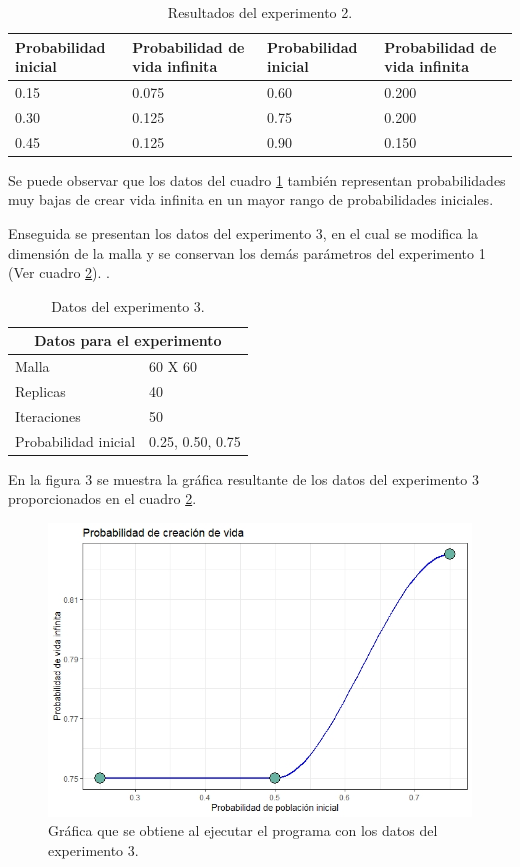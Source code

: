 \documentclass{article}
\begin{document}
\begin{table}[ht]
\centering
\begin{tabular}{ |p{3cm}|p{4.5cm}||p{3cm}|p{4.5cm}|}
 \hline
 Probabilidad inicial & Probabilidad de vida infinita & Probabilidad inicial & Probabilidad de vida infinita\\
 \hline
 0.15 & 0.075 & 0.60 & 0.200 \\
 \hline
 0.30 & 0.125 & 0.75 & 0.200 \\
 \hline
 0.45 & 0.125 & 0.90 & 0.150 \\
 \hline
\end{tabular}
\caption{Resultados del experimento 2.}
\label{Cuadro 4}
\end{table}

Se puede observar que los datos del cuadro \ref{Cuadro 4} también representan probabilidades muy bajas de crear vida infinita en un mayor rango de probabilidades iniciales.
\bigskip

Enseguida se presentan los datos del experimento 3, en el cual se modifica la dimensión de la malla y se conservan los demás parámetros del experimento 1 (Ver cuadro \ref{Cuadro5}).
\newpage
.
\bigskip

\begin{table}[ht]
\centering
\begin{tabular}{ |p{3cm}||p{5cm}|}
 \hline
 \multicolumn{2}{|c|}{Datos para el experimento} \\
 \hline
 Malla       & 60 X 60 \\
 \hline
 Replicas    & 40 \\
 \hline
 Iteraciones & 50 \\
 \hline
 Probabilidad inicial & 0.25, 0.50, 0.75 \\
 \hline
\end{tabular}
\caption{Datos del experimento 3.}
\label{Cuadro5}
\end{table}

En la figura 3 se muestra la gráfica resultante de los datos del experimento 3 proporcionados en el cuadro \ref{Cuadro5}. 

\begin{figure} [h!]%
    \centering
    \includegraphics[width=150mm]{Figura3.jpeg} %
    \caption{Gráfica que se obtiene al ejecutar el programa con los datos del experimento 3.}
    \label{Figura3}
\end{figure}
\end{document}
